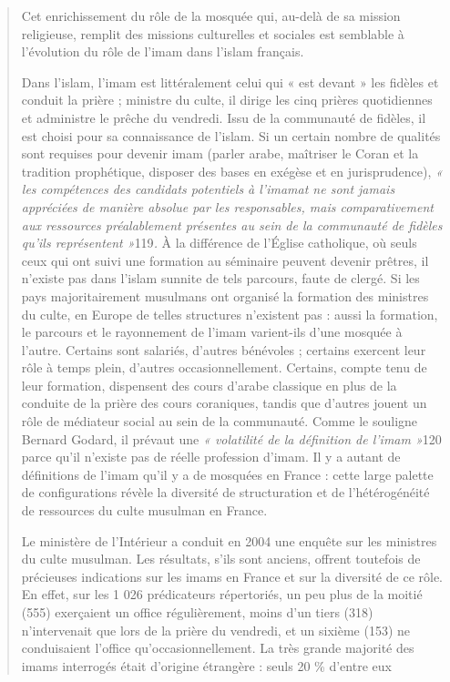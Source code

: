 \begin{quote}
Cet enrichissement du rôle de la mosquée qui, au-delà de sa mission
religieuse, remplit des missions culturelles et sociales est semblable à
l'évolution du rôle de l'imam dans l'islam français.

Dans l'islam, l'imam est littéralement celui qui « est devant » les
fidèles et conduit la prière ; ministre du culte, il dirige les cinq
prières quotidiennes et administre le prêche du vendredi. Issu de la
communauté de fidèles, il est choisi pour sa connaissance de l'islam. Si
un certain nombre de qualités sont requises pour devenir imam (parler
arabe, maîtriser le Coran et la tradition prophétique, disposer des
bases en exégèse et en jurisprudence), \emph{« les compétences des
candidats potentiels à l'imamat ne sont jamais appréciées de manière
absolue par les responsables, mais comparativement aux ressources
préalablement présentes au sein de la communauté de fidèles qu'ils
représentent »}119\emph{.} À la différence de l'Église catholique, où
seuls ceux qui ont suivi une formation au séminaire peuvent devenir
prêtres, il n'existe pas dans l'islam sunnite de tels parcours, faute de
clergé. Si les pays majoritairement musulmans ont organisé la formation
des ministres du culte, en Europe de telles structures n'existent pas :
aussi la formation, le parcours et le rayonnement de l'imam varient-ils
d'une mosquée à l'autre. Certains sont salariés, d'autres bénévoles ;
certains exercent leur rôle à temps plein, d'autres occasionnellement.
Certains, compte tenu de leur formation, dispensent des cours d'arabe
classique en plus de la conduite de la prière des cours coraniques,
tandis que d'autres jouent un rôle de médiateur social au sein de la
communauté. Comme le souligne Bernard Godard, il prévaut une \emph{«
volatilité de la définition de l'imam »}120 parce qu'il n'existe pas de
réelle profession d'imam. Il y a autant de définitions de l'imam qu'il y
a de mosquées en France : cette large palette de configurations révèle
la diversité de structuration et de l'hétérogénéité de ressources du
culte musulman en France.

Le ministère de l'Intérieur a conduit en 2004 une enquête sur les
ministres du culte musulman. Les résultats, s'ils sont anciens, offrent
toutefois de précieuses indications sur les imams en France et sur la
diversité de ce rôle. En effet, sur les 1 026 prédicateurs répertoriés,
un peu plus de la moitié (555) exerçaient un office régulièrement, moins
d'un tiers (318) n'intervenait que lors de la prière du vendredi, et un
sixième (153) ne conduisaient l'office qu'occasionnellement. La très
grande majorité des imams interrogés était d'origine étrangère : seuls
20 \% d'entre eux


\end{quote}
